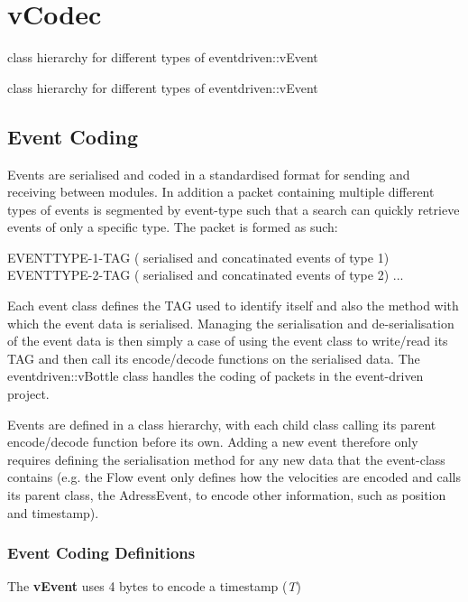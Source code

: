 \hypertarget{group__vCodec}{}\section{v\+Codec}
\label{group__vCodec}


class hierarchy for different types of eventdriven\+::v\+Event  


class hierarchy for different types of eventdriven\+::v\+Event 

\subsection*{Event Coding }

Events are serialised and coded in a standardised format for sending and receiving between modules. In addition a packet containing multiple different types of events is segmented by event-\/type such that a search can quickly retrieve events of only a specific type. The packet is formed as such\+: \begin{DoxyVerb}EVENTTYPE-1-TAG ( serialised and concatinated events of type 1) EVENTTYPE-2-TAG ( serialised and concatinated events of type 2) ...
\end{DoxyVerb}


Each event class defines the T\+AG used to identify itself and also the method with which the event data is serialised. Managing the serialisation and de-\/serialisation of the event data is then simply a case of using the event class to write/read its T\+AG and then call its encode/decode functions on the serialised data. The eventdriven\+::v\+Bottle class handles the coding of packets in the event-\/driven project.

Events are defined in a class hierarchy, with each child class calling its parent encode/decode function before its own. Adding a new event therefore only requires defining the serialisation method for any new data that the event-\/class contains (e.\+g. the Flow event only defines how the velocities are encoded and calls its parent class, the Adress\+Event, to encode other information, such as position and timestamp).

 \subsubsection*{Event Coding Definitions }

The {\bfseries v\+Event} uses 4 bytes to encode a timestamp ({\itshape T}) \begin{DoxyVerb}
\end{DoxyVerb}


